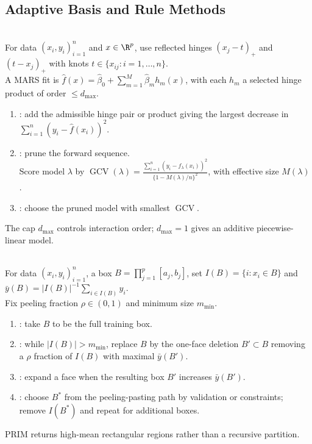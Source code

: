 \subsection{Adaptive Basis and Rule Methods}
\begin{method} \label{meth:sl-mars-adaptive-basis} \\
For data $(x_i,y_i)_{i=1}^n$ and $x\in\R^p$, use reflected hinges $(x_j-t)_+$ and $(t-x_j)_+$ with knots $t\in\{x_{ij}:i=1,\ldots,n\}$.\\
A MARS fit is $\widehat{f}(x)=\widehat{\beta}_0+\sum\limits_{m=1}^M\widehat{\beta}_m h_m(x)$, with each $h_m$ a selected hinge product of order $\le d_{\max}$.
\begin{enumerate}[label=(\roman*)]
\setlength{\itemsep}{0pt}
\item {}: add the admissible hinge pair or product giving the largest decrease in $\sum\limits_{i=1}^n(y_i-\widehat{f}(x_i))^2$.
\item {}: prune the forward sequence.\\
Score model $\lambda$ by $\operatorname{GCV}(\lambda)=\frac{\sum\limits_{i=1}^n(y_i-\widehat{f}_\lambda(x_i))^2}{\{1-M(\lambda)/n\}^2}$, with effective size $M(\lambda)$.
\item {}: choose the pruned model with smallest $\operatorname{GCV}$.
\end{enumerate}
The cap $d_{\max}$ controls interaction order; $d_{\max}=1$ gives an additive piecewise-linear model.
\end{method}

\begin{method} \label{meplth:sl-prim-box-peeling} \\
For data $(x_i,y_i)_{i=1}^n$, a box $B=\prod_{j=1}^p[a_j,b_j]$, set $I(B)=\{i:x_i\in B\}$ and $\bar y(B)=|I(B)|^{-1}\sum\limits_{i\in I(B)}y_i$.\\
Fix peeling fraction $\rho\in(0,1)$ and minimum size $m_{\min}$.
\begin{enumerate}[label=(\roman*)]
\setlength{\itemsep}{0pt}
\item {}: take $B$ to be the full training box.
\item {}: while $|I(B)|>m_{\min}$, replace $B$ by the one-face deletion $B'\subset B$ removing a $\rho$ fraction of $I(B)$ with maximal $\bar y(B')$.
\item {}: expand a face when the resulting box $B'$ increases $\bar y(B')$.
\item {}: choose $B^*$ from the peeling-pasting path by validation or constraints; remove $I(B^*)$ and repeat for additional boxes.
\end{enumerate}
PRIM returns high-mean rectangular regions rather than a recursive partition.
\end{method}

